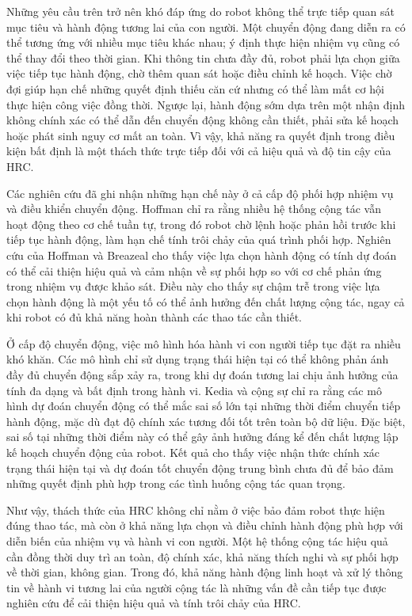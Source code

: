 Những yêu cầu trên trở nên khó đáp ứng do robot không thể trực tiếp quan sát mục tiêu và hành động tương lai của con người. Một chuyển động đang diễn ra có thể tương ứng với nhiều mục tiêu khác nhau; ý định thực hiện nhiệm vụ cũng có thể thay đổi theo thời gian. Khi thông tin chưa đầy đủ, robot phải lựa chọn giữa việc tiếp tục hành động, chờ thêm quan sát hoặc điều chỉnh kế hoạch. Việc chờ đợi giúp hạn chế những quyết định thiếu căn cứ nhưng có thể làm mất cơ hội thực hiện công việc đồng thời. Ngược lại, hành động sớm dựa trên một nhận định không chính xác có thể dẫn đến chuyển động không cần thiết, phải sửa kế hoạch hoặc phát sinh nguy cơ mất an toàn. Vì vậy, khả năng ra quyết định trong điều kiện bất định là một thách thức trực tiếp đối với cả hiệu quả và độ tin cậy của HRC.

Các nghiên cứu đã ghi nhận những hạn chế này ở cả cấp độ phối hợp nhiệm vụ và điều khiển chuyển động. Hoffman \cite{hoffman2019evaluatingfluency} chỉ ra rằng nhiều hệ thống cộng tác vẫn hoạt động theo cơ chế tuần tự, trong đó robot chờ lệnh hoặc phản hồi trước khi tiếp tục hành động, làm hạn chế tính trôi chảy của quá trình phối hợp. Nghiên cứu của Hoffman và Breazeal \cite{hoffman2007effectsofanticipatoryaction} cho thấy việc lựa chọn hành động có tính dự đoán có thể cải thiện hiệu quả và cảm nhận về sự phối hợp so với cơ chế phản ứng trong nhiệm vụ được khảo sát. Điều này cho thấy sự chậm trễ trong việc lựa chọn hành động là một yếu tố có thể ảnh hưởng đến chất lượng cộng tác, ngay cả khi robot có đủ khả năng hoàn thành các thao tác cần thiết.

Ở cấp độ chuyển động, việc mô hình hóa hành vi con người tiếp tục đặt ra nhiều khó khăn. Các mô hình chỉ sử dụng trạng thái hiện tại có thể không phản ánh đầy đủ chuyển động sắp xảy ra, trong khi dự đoán tương lai chịu ảnh hưởng của tính đa dạng và bất định trong hành vi. Kedia và cộng sự \cite{kedia2023manicastcollaborative} chỉ ra rằng các mô hình dự đoán chuyển động có thể mắc sai số lớn tại những thời điểm chuyển tiếp hành động, mặc dù đạt độ chính xác tương đối tốt trên toàn bộ dữ liệu. Đặc biệt, sai số tại những thời điểm này có thể gây ảnh hưởng đáng kể đến chất lượng lập kế hoạch chuyển động của robot. Kết quả cho thấy việc nhận thức chính xác trạng thái hiện tại và dự đoán tốt chuyển động trung bình chưa đủ để bảo đảm những quyết định phù hợp trong các tình huống cộng tác quan trọng.

Như vậy, thách thức của HRC không chỉ nằm ở việc bảo đảm robot thực hiện đúng thao tác, mà còn ở khả năng lựa chọn và điều chỉnh hành động phù hợp với diễn biến của nhiệm vụ và hành vi con người. Một hệ thống cộng tác hiệu quả cần đồng thời duy trì an toàn, độ chính xác, khả năng thích nghi và sự phối hợp về thời gian, không gian. Trong đó, khả năng hành động linh hoạt và xử lý thông tin về hành vi tương lai của người cộng tác là những vấn đề cần tiếp tục được nghiên cứu để cải thiện hiệu quả và tính trôi chảy của HRC.


